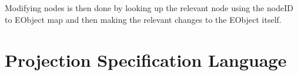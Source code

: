 \documentclass{article}
\begin{document}
\\
\\
Modifying nodes is then done by looking up the relevant node using the nodeID to EObject map and then making the relevant changes to the EObject itself.

\section{Projection Specification Language}\label{EditorLanguage}
\end{document}
